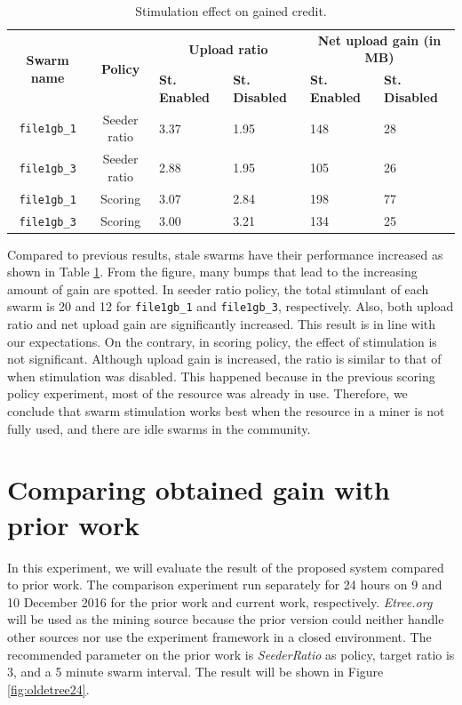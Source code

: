 \begin{table}[h]
	\centering
	\caption{Stimulation effect on gained credit.}
	\label{tbl:stimul}
	\begin{adjustwidth}{-1cm}{}
	\begin{tabular}{|c|c|l|l|l|l|}
		\hline
		\multirow{2}{*}{\textbf{Swarm name}} & \multirow{2}{*}{\textbf{Policy}} & \multicolumn{2}{c|}{\textbf{Upload ratio}} & \multicolumn{2}{c|}{\textbf{Net upload gain (in MB)}} \\ \cline{3-6} 
		&  & \textbf{St. Enabled} & \textbf{St. Disabled} & \textbf{St. Enabled} & \textbf{St. Disabled} \\ \hline
		\texttt{file1gb\_1} & Seeder ratio & 3.37 & 1.95 & 148 & 28 \\ \hline
		\texttt{file1gb\_3} & Seeder ratio & 2.88 & 1.95 & 105 & 26 \\ \hline
		\texttt{file1gb\_1} & Scoring & 3.07 & 2.84 & 198 & 77 \\ \hline
		\texttt{file1gb\_3} & Scoring & 3.00 & 3.21 & 134 & 25 \\ \hline
	\end{tabular}
\end{adjustwidth}
\end{table}

Compared to previous results, stale swarms have  their performance increased as shown in Table \ref{tbl:stimul}. From the figure, many bumps that lead to the increasing amount of gain are spotted. In seeder ratio policy, the total stimulant of each swarm is 20 and 12 for \texttt{file1gb\_1} and \texttt{file1gb\_3}, respectively. Also, both upload ratio and net upload gain are significantly increased. This result is in line with our expectations. On the contrary, in scoring policy, the effect of stimulation is not significant. Although upload gain is increased, the ratio is similar to that of when stimulation was disabled. This happened because in the previous scoring policy experiment, most of the resource was already in use. Therefore, we conclude that swarm stimulation works best when the resource in a miner is not fully used, and there are idle swarms in the community.

\vspace{-0.3cm} 
\section{Comparing obtained gain with prior work}
In this experiment, we will evaluate the result of the proposed system compared to prior work. The comparison experiment run separately for 24 hours on 9 and 10 December 2016 for the prior work and current work, respectively. \textit{Etree.org} will be used as the mining source because the prior version could neither handle other sources nor use the experiment framework in a closed environment. The recommended parameter on the prior work is \textit{SeederRatio} as policy, target ratio is 3, and a 5 minute swarm interval. The result will be shown in Figure \ref{fig:oldetree24}.

